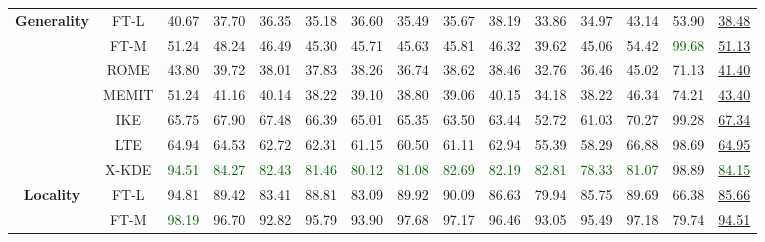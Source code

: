 \begin{table*}[!h]
{\begin{tabular}{ccccccccccccccc}
           \midrule
           \multirow{7}{*}{\textbf{Generality}} 
            & FT-L & 40.67 & 37.70 & 36.35 & 35.18 & 36.60 & 35.49 & 35.67 & 38.19 & 33.86 & 34.97 & 43.14 & 53.90 & \underline{38.48} \\
            & FT-M & 51.24 & 48.24 & 46.49 & 45.30 & 45.71 & 45.63 & 45.81 & 46.32 & 39.62 & 45.06 & 54.42 & \textcolor{darkgreen}{99.68} & \underline{51.13} \\
            & ROME & 43.80 & 39.72 & 38.01 & 37.83 & 38.26 & 36.74 & 38.62 & 38.46 & 32.76 & 36.46 & 45.02 & 71.13 & \underline{41.40} \\
            & MEMIT & 51.24 & 41.16 & 40.14 & 38.22 & 39.10 & 38.80 & 39.06 & 40.15 & 34.18 & 38.22 & 46.34 & 74.21 & \underline{43.40} \\
            & IKE & 65.75 & 67.90 & 67.48 & 66.39 & 65.01 & 65.35 & 63.50 & 63.44 & 52.72 & 61.03 & 70.27 & 99.28 & \underline{67.34} \\
            & LTE & 64.94 & 64.53 & 62.72 & 62.31 & 61.15 & 60.50 & 61.11 & 62.94 & 55.39 & 58.29 & 66.88 & 98.69 & \underline{64.95} \\
           \cmidrule{2-15}
            & X-KDE & \textcolor{darkgreen}{94.51} & \textcolor{darkgreen}{84.27} & \textcolor{darkgreen}{82.43} & \textcolor{darkgreen}{81.46} & \textcolor{darkgreen}{80.12} & \textcolor{darkgreen}{81.08} & \textcolor{darkgreen}{82.69} & \textcolor{darkgreen}{82.19} & \textcolor{darkgreen}{82.81} & \textcolor{darkgreen}{78.33} & \textcolor{darkgreen}{81.07} & 98.89 & \underline{\textcolor{darkgreen}{84.15}} \\
           \midrule
           \multirow{7}{*}{\textbf{Locality}} 
            & FT-L & 94.81 & 89.42 & 83.41 & 88.81 & 83.09 & 89.92 & 90.09 & 86.63 & 79.94 & 85.75 & 89.69 & 66.38 & \underline{85.66} \\
            & FT-M & \textcolor{darkgreen}{98.19} & 96.70 & 92.82 & 95.79 & 93.90 & 97.68 & 97.17 & 96.46 & 93.05 & 95.49 & 97.18 & 79.74 & \underline{94.51} \\

\end{tabular}}
\end{table*}

